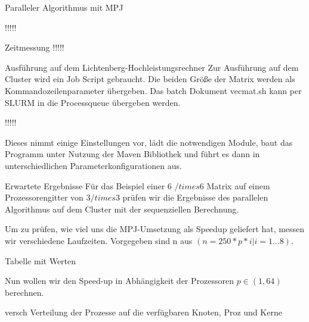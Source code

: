 \documentclass[
ngerman,
subtask=ruled %
]{tudaexercise}
\begin{document}
	
	\begin{task}{Paralleler Algorithmus mit MPJ}
		
		!!!!!
	
	\end{task}
	
	\begin{task}{Zeitmessung}
		!!!!!
	
		
	\end{task}
	
	\begin{task}{Ausführung auf dem Lichtenberg-Hochleistungsrechner} 
		Zur Ausführung auf dem Cluster wird ein Job Script gebraucht. 
		Die beiden Größe der Matrix werden als Kommandozeilenparameter übergeben.
		Das batch Dokument vecmat.sh kann per SLURM in die Processqueue übergeben werden.
		
		!!!!!
		
		Dieses nimmt einige Einstellungen vor, lädt die notwendigen Module, baut das Programm unter Nutzung der Maven Bibliothek und führt es dann in unterschiedlichen Parameterkonfigurationen aus.
	\end{task}

	

	\begin{task} {Erwartete Ergebnisse}
		Für das Beispiel einer 6 $/times$6 Matrix auf einem Prozessorengitter von 3$/times$3 prüfen wir die Ergebnisse des parallelen Algorithmus auf dem Cluster mit der sequenziellen Berechnung.
		
		Um zu prüfen, wie viel uns die MPJ-Umsetzung als Speedup geliefert hat, messen wir verschiedene Laufzeiten.
		Vorgegeben sind n aus $(n = 250 * p * i | i=1...8)$.
		
		Tabelle mit Werten
		
		Nun wollen wir den Speed-up in Abhängigkeit der Prozessoren $p \in (1, 64)$ berechnen.
		
		versch Verteilung der Prozesse auf die verfügbaren Knoten, Proz und Kerne
	\end{task}


	\appendix
\end{document}
